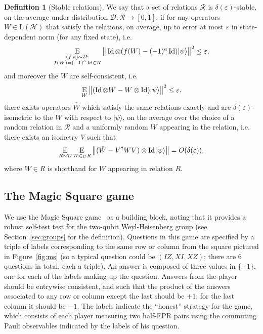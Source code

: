 \documentclass[11pt]{article}
\theoremstyle{remark}
\theoremstyle{definition}
\newtheorem{definition}[theorem]{Definition}
\newcommand{\ket}[1]{|#1\rangle}
\newcommand{\Id}{\ensuremath{\mathop{\rm Id}\nolimits}}
\newcommand{\Es}[1]{\ensuremath{\mathop{\textsc{E}}_{#1}}}
\newcommand{\mH}{\mathcal{H}}
\newcommand{\setft}[1]{\mathrm{#1}}
\newcommand{\Lin}{\setft{L}}
\newcommand{\eps}{\varepsilon}
\begin{document}
\begin{definition}[Stable relations]
We say that a set of relations $\mathcal{R}$ is $\delta(\eps)$-stable, on the average under distribution $\mathcal{D}:\mathcal{R}\to[0,1]$, if for any operators $W\in\Lin(\mH)$ that satisfy the relations, on average, up to error at most $\eps$ in state-dependent norm (for any fixed state), i.e. 
$$\Es{\substack{(f,a)\sim\mathcal{D}:\\f(W)=(-1)^a\Id \in\mathcal{R}}} \big\| \Id\otimes (f(W)-(-1)^a \Id) \ket{\psi}\big\|^2 \leq \eps,$$
and moreover the $W$ are self-consistent, i.e.
$$ \Es{W} \big\| (\Id\otimes W - W \otimes \Id)\ket{\psi}\big\|^2\leq \eps,$$
  there exists operators $\hat{W}$ which satisfy the same relations exactly and are $\delta(\eps)$-isometric to the $W$ with respect to $\ket{\psi}$, on the average over the choice of a random relation in $\mathcal{R}$ and a uniformly random $W$ appearing in the relation, i.e. there exists an isometry $V$ such that 
  \begin{equation}
    \Es{R \sim\mathcal{D}} \Es{W \in_U R} \big\|( \hat{W}-V^\dagger WV)\otimes \Id \ket{\psi}\big\|=O(\delta(\eps)), \nonumber
  \end{equation}
where $W \in R$ is shorthand for $W$ appearing in relation $R$.
	\end{definition}

\subsection{The Magic Square game}
\label{sec:ms}

We use the Magic Square game~\cite{Mermin90} as a building block, noting that it  provides a robust self-test test for the two-qubit Weyl-Heisenberg group (see Section~\ref{sec:groups} for the definition). Questions in this game are specified by a triple of labels corresponding to the same row or column from the square pictured in Figure~\ref{fig:ms} (so a typical question could be $(IZ,XI,XZ)$; there are $6$ questions in total, each a triple). An answer is composed of three values in $\{\pm 1\}$, one for each of the labels making up the question. Answers from the player should be entrywise consistent, and such that the product of the answers associated to any row or column except the last should be $+1$; for the last column it should be $-1$. The labels indicate the ``honest'' strategy for the game, which consists of each player measuring two half-EPR pairs using the commuting Pauli observables indicated by the labels of his question. 
\end{document}
